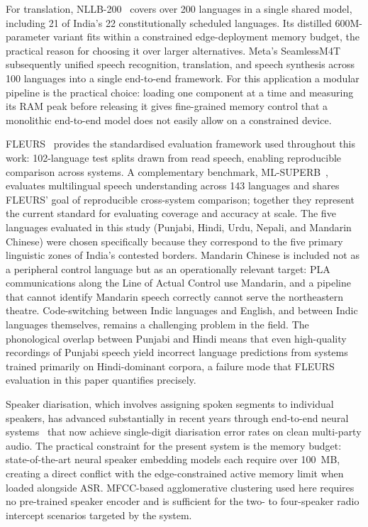 \documentclass[conference]{IEEEtran}
\begin{document}
For translation, NLLB-200~\cite{costajussa2024nllb} covers over 200 languages in a single shared model, including 21 of India's 22 constitutionally scheduled languages. Its distilled 600M-parameter variant fits within a constrained edge-deployment memory budget, the practical reason for choosing it over larger alternatives. Meta's SeamlessM4T~\cite{barrault2023seamless} subsequently unified speech recognition, translation, and speech synthesis across 100 languages into a single end-to-end framework. For this application a modular pipeline is the practical choice: loading one component at a time and measuring its RAM peak before releasing it gives fine-grained memory control that a monolithic end-to-end model does not easily allow on a constrained device.

FLEURS~\cite{conneau2023fleurs} provides the standardised evaluation framework used throughout this work: 102-language test splits drawn from read speech, enabling reproducible comparison across systems. A complementary benchmark, ML-SUPERB~\cite{shi2023mlsuperb}, evaluates multilingual speech understanding across 143 languages and shares FLEURS' goal of reproducible cross-system comparison; together they represent the current standard for evaluating coverage and accuracy at scale. The five languages evaluated in this study (Punjabi, Hindi, Urdu, Nepali, and Mandarin Chinese) were chosen specifically because they correspond to the five primary linguistic zones of India's contested borders. Mandarin Chinese is included not as a peripheral control language but as an operationally relevant target: PLA communications along the Line of Actual Control use Mandarin, and a pipeline that cannot identify Mandarin speech correctly cannot serve the northeastern theatre. Code-switching between Indic languages and English, and between Indic languages themselves, remains a challenging problem in the field. The phonological overlap between Punjabi and Hindi means that even high-quality recordings of Punjabi speech yield incorrect language predictions from systems trained primarily on Hindi-dominant corpora, a failure mode that FLEURS evaluation in this paper quantifies precisely.

Speaker diarisation, which involves assigning spoken segments to individual speakers, has advanced substantially in recent years through end-to-end neural systems~\cite{plaquet2023powerset} that now achieve single-digit diarisation error rates on clean multi-party audio. The practical constraint for the present system is the memory budget: state-of-the-art neural speaker embedding models each require over 100~MB, creating a direct conflict with the edge-constrained active memory limit when loaded alongside ASR. MFCC-based agglomerative clustering used here requires no pre-trained speaker encoder and is sufficient for the two- to four-speaker radio intercept scenarios targeted by the system.
\end{document}
